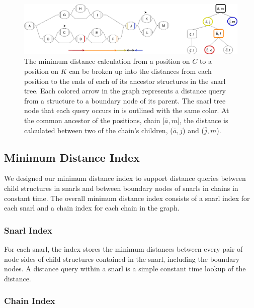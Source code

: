 \documentclass[11pt]{ucscthesis}
\begin{document}
\begin{figure}
    \centering
    \includegraphics[width=\columnwidth]{aim1_distance_calculation_example.png}
    \caption[Minimum distance calculation]{The minimum distance calculation from a position on $C$ to a position on $K$ can be broken up into the distances from each position to the ends of each of its ancestor structures in the snarl tree. Each colored arrow in the graph represents a distance query from a structure to a boundary node of its parent. The snarl tree node that each query occurs in is outlined with the same color. At the common ancestor of the positions, chain [$\bar{a}, m$], the distance is calculated between two of the chain's children, ($\bar{a}, j$) and ($\bar{j}, m$). }
    \label{fig:aim1_distance_calculation_example}
\end{figure}


\subsection{Minimum Distance Index}

We designed our minimum distance index to support distance queries between child structures in snarls and between boundary nodes of snarls in chains in constant time.
The overall minimum distance index consists of a snarl index for each snarl and a chain index for each chain in the graph.

\subsubsection{Snarl Index}

For each snarl, the index stores the minimum distances between every pair of node sides of child structures contained in the snarl, including the boundary nodes.
A distance query within a snarl is a simple constant time lookup of the distance.

\subsubsection{Chain Index}
\end{document}
